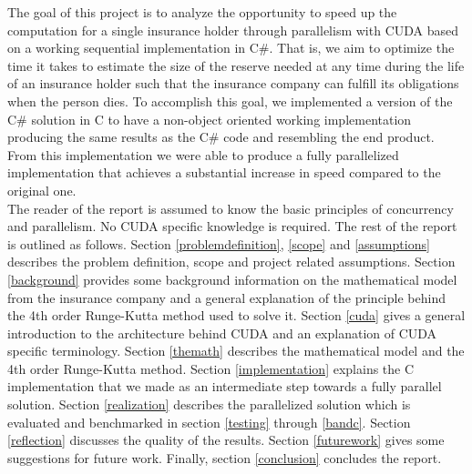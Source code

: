 The goal of this project is to analyze the opportunity to speed up the computation for a single insurance holder through parallelism with CUDA based on a working sequential implementation in C\#. That is, we aim to optimize the time it takes to estimate the size of the reserve needed at any time during the life of an insurance holder such that the insurance company can fulfill its obligations when the person dies. To accomplish this goal, we implemented a version of the C\# solution in C to have a non-object oriented working implementation producing the same results as the C\# code and resembling the end product. From this implementation we were able to produce a fully parallelized implementation that achieves a substantial increase in speed compared to the original one.\\

The reader of the report is assumed to know the basic principles of concurrency and parallelism. No CUDA specific knowledge is required. The rest of the report is outlined as follows. Section \ref{problemdefinition}, \ref{scope} and \ref{assumptions} describes the problem definition, scope and project related assumptions. Section \ref{background} provides some background information on the mathematical model from the insurance company and a general explanation of the principle behind the 4th order Runge-Kutta method used to solve it. Section \ref{cuda} gives a general introduction to the architecture behind CUDA and an explanation of CUDA specific terminology. Section \ref{themath} describes the mathematical model and the 4th order Runge-Kutta method. Section \ref{implementation} explains the C implementation that we made as an intermediate step towards a fully parallel solution. Section \ref{realization} describes the parallelized solution which is evaluated and benchmarked in section \ref{testing} through \ref{bandc}. Section \ref{reflection} discusses the quality of the results. Section \ref{futurework} gives some suggestions for future work. Finally, section \ref{conclusion} concludes the report.
